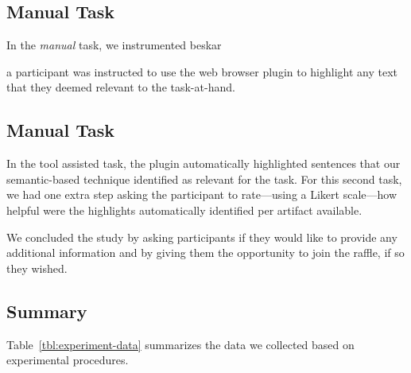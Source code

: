 \subsection{Manual Task}



In the \textit{manual} task, we instrumented \acs{beskar}


a participant was instructed to use the web browser plugin to highlight any text that they deemed relevant to the task-at-hand. 

\subsection{Manual Task}

In the tool assisted task, the plugin automatically highlighted sentences that our semantic-based technique identified as relevant for the task. 
For this second task, we had one extra step asking the participant to rate---using a Likert scale---how helpful were the highlights automatically identified per artifact available. 


We concluded the study by asking participants if they would like to provide any additional information and 
by giving them the opportunity to join the raffle, if so they wished. 



\subsection{Summary}



Table~\ref{tbl:experiment-data} summarizes the data we collected based on experimental procedures.
















